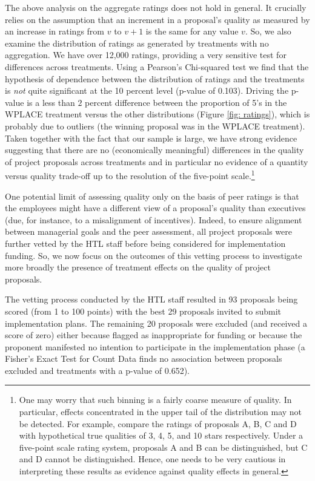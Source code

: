 \documentclass[12pt, titlepage]{article}
\begin{document}
The above analysis on the aggregate ratings does not hold in general. It
crucially relies on the assumption that an increment in a proposal's
quality as measured by an increase in ratings from \(v\) to \(v+1\) is
the same for any value \(v\). So, we also examine the distribution of
ratings as generated by treatments with no aggregation. We have over
12,000 ratings, providing a very sensitive test for differences across
treatments. Using a Pearson's Chi-squared test we find that the
hypothesis of dependence between the distribution of ratings and the
treatments is \emph{not} quite significant at the 10 percent level
(p-value of 0.103). Driving the p-value is a less than \(2\) percent
difference between the proportion of 5's in the WPLACE treatment versus
the other distributions (Figure \ref{fig: ratings}), which is probably
due to outliers (the winning proposal was in the WPLACE treatment).
Taken together with the fact that our sample is large, we have strong
evidence suggesting that there are no (economically meaningful)
differences in the quality of project proposals across treatments and in
particular no evidence of a quantity versus quality trade-off up to the
resolution of the five-point scale.\footnote{One may worry that such
  binning is a fairly coarse measure of quality. In particular, effects
  concentrated in the upper tail of the distribution may not be
  detected. For example, compare the ratings of proposals A, B, C and D
  with hypothetical true qualities of 3, 4, 5, and 10 stars
  respectively. Under a five-point scale rating system, proposals A and
  B can be distinguished, but C and D cannot be distinguished. Hence,
  one needs to be very cautious in interpreting these results as
  evidence against quality effects in general.}

One potential limit of assessing quality only on the basis of peer
ratings is that the employees might have a different view of a
proposal's quality than executives (due, for instance, to a misalignment
of incentives). Indeed, to ensure alignment between managerial goals and
the peer assessment, all project proposals were further vetted by the
HTL staff before being considered for implementation funding. So, we now
focus on the outcomes of this vetting process to investigate more
broadly the presence of treatment effects on the quality of project
proposals.

The vetting process conducted by the HTL staff resulted in 93 proposals
being scored (from 1 to 100 points) with the best 29 proposals invited
to submit implementation plans. The remaining 20 proposals were excluded
(and received a score of zero) either because flagged as inappropriate
for funding or because the proponent manifested no intention to
participate in the implementation phase (a Fisher's Exact Test for Count
Data finds no association between proposals excluded and treatments with
a p-value of 0.652).
\end{document}
